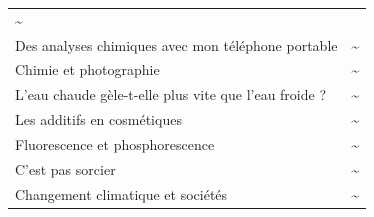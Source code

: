 \documentclass[
  10pt,
  french,
  a5paper,
  openany]{book}
\begin{document}
\begin{longtable}[]{@{}lc@{}}
\begin{minipage}[t]{0.06\columnwidth}
\textasciitilde{}\strut
\end{minipage}\tabularnewline
\begin{minipage}[t]{0.88\columnwidth}\raggedright
Des analyses chimiques avec mon téléphone portable\strut
\end{minipage} & \begin{minipage}[t]{0.06\columnwidth}\centering
\textasciitilde{}\strut
\end{minipage}\tabularnewline
\begin{minipage}[t]{0.88\columnwidth}\raggedright
Chimie et photographie\strut
\end{minipage} & \begin{minipage}[t]{0.06\columnwidth}\centering
\textasciitilde{}\strut
\end{minipage}\tabularnewline
\begin{minipage}[t]{0.88\columnwidth}\raggedright
L'eau chaude gèle-t-elle plus vite que l'eau froide ?\strut
\end{minipage} & \begin{minipage}[t]{0.06\columnwidth}\centering
\textasciitilde{}\strut
\end{minipage}\tabularnewline
\begin{minipage}[t]{0.88\columnwidth}\raggedright
Les additifs en cosmétiques\strut
\end{minipage} & \begin{minipage}[t]{0.06\columnwidth}\centering
\textasciitilde{}\strut
\end{minipage}\tabularnewline
\begin{minipage}[t]{0.88\columnwidth}\raggedright
Fluorescence et phosphorescence\strut
\end{minipage} & \begin{minipage}[t]{0.06\columnwidth}\centering
\textasciitilde{}\strut
\end{minipage}\tabularnewline
\begin{minipage}[t]{0.88\columnwidth}\raggedright
C'est pas sorcier\strut
\end{minipage} & \begin{minipage}[t]{0.06\columnwidth}\centering
\textasciitilde{}\strut
\end{minipage}\tabularnewline
\begin{minipage}[t]{0.88\columnwidth}\raggedright
Changement climatique et sociétés\strut
\end{minipage} & \begin{minipage}[t]{0.06\columnwidth}\centering
\textasciitilde{}\strut

\end{minipage}
\end{longtable}
\end{document}

